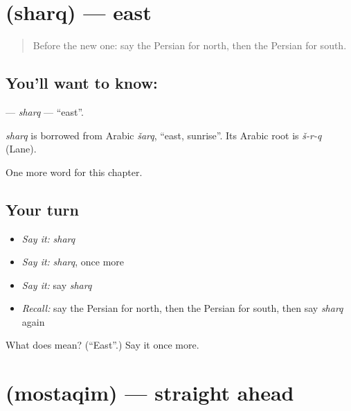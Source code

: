 \section[\texorpdfstring{\fa{شرق} (sharq)}{شرق (sharq)}]{ (sharq) — east}

\label{lesson:FA-C230-sharq}



\begin{quote}
Before the new one: say the Persian for north, then the Persian for south.
\end{quote}

\subsection*{You'll want to know: }
\textbf{} — \emph{sharq} — \textquotedblleft{}east\textquotedblright{}.

\begin{cousinweb}
\emph{sharq} is borrowed from Arabic \emph{šarq}, \textquotedblleft{}east, sunrise\textquotedblright{}. Its Arabic root is \emph{š-r-q} (Lane).
\end{cousinweb}

\begin{grammarlens}[title={What you've built}]
One more word for this chapter.
\end{grammarlens}

\subsection*{Your turn}
\begin{itemize}
\raggedright
  \item \emph{Say it:} \emph{sharq}
  \item \emph{Say it:} \emph{sharq}, once more
  \item \emph{Say it:} say \emph{sharq}
  \item \emph{Recall:} say the Persian for north, then the Persian for south, then say \emph{sharq} again
\end{itemize}

\begin{tcolorbox}[breakable,colback=teal!4,colframe=teal!35!black,title={Before you move on}]
What does  mean? (\textquotedblleft{}East\textquotedblright{}.) Say it once more.
\end{tcolorbox}
\section[\texorpdfstring{\fa{مستقیم} (mostaqim)}{مستقیم (mostaqim)}]{ (mostaqim) — straight ahead}

